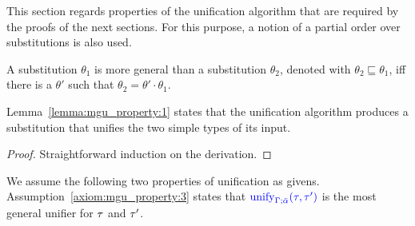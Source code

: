 This section regards properties of the unification algorithm that are required by the proofs of
the next sections. For this purpose, a notion of a partial order over substitutions is also
used.

\begin{definition}
A substitution $\theta_1$ is more general than a substitution $\theta_2$, denoted with
$\theta_2\sqsubseteq\theta_1$, iff there is a $\theta'$ such that $\theta_2 = \theta'\cdot\theta_1$.
\end{definition}

Lemma~\ref{lemma:mgu_property:1} states that the unification algorithm produces
a substitution that unifies the two simple types of its input.\\

{\centering
{}}

\begin{proof}
Straightforward induction on the derivation.
\end{proof}

We assume the following two properties of unification as givens.\\

Assumption~\ref{axiom:mgu_property:3} states that ${\color{blue} \mathrm{unify}_{\Gamma;\bar{\alpha}}(\tau,\tau')}$ is the most general unifier for $\tau$ and $\tau'$.\\

